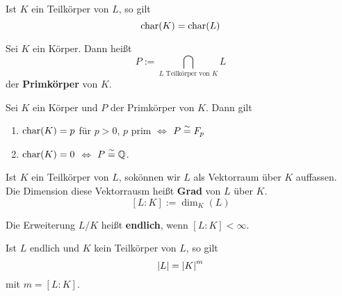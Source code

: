	\begin{prop}
		Ist $K$ ein Teilkörper von $L$, so gilt
		\[\operatorname{char}(K)=\operatorname{char}(L)\]
	\end{prop}

	\begin{definition}
		Sei $K$ ein Körper. Dann heißt
		\[P:=\bigcap_{\text{$L$ Teilkörper von $K$}}L\]
		der \textbf{Primkörper} von $K$.
	\end{definition}

	\begin{satz}
		Sei $K$ ein Körper und $P$ der Primkörper von $K$. Dann gilt
		\begin{enumerate}
			\item $\operatorname{char}(K)=p$ für $p>0$, $p$ prim $\Leftrightarrow$ $P\overset{\sim}{=} F_p$
			\item $\operatorname{char}(K)=0$ $\Leftrightarrow$ $P\overset{\sim}{=}\mathbb{Q}$.
		\end{enumerate}
	\end{satz}

	\begin{definition}
		Ist $K$ ein Teilkörper von $L$, sokönnen wir $L$ als Vektorraum über $K$ auffassen.\\
		Die Dimension diese Vektorrausm heißt \textbf{Grad} von $L$ über $K$.
		\[[L:K]:=\dim_K(L)\]
	\end{definition}

	\begin{definition}
		Die Erweiterung $L/K$ heißt \textbf{endlich}, wenn $[L:K]<\infty$.\\
	\end{definition}

	\begin{prop}
		Ist $L$ endlich und $K$ kein Teilkörper von $L$, so gilt \[\left|L\right|=\left|K\right|^m\]
		mit $m=[L:K]$.
	\end{prop}

